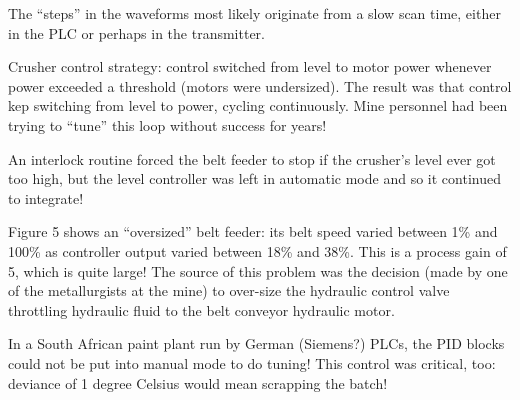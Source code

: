 












The ``steps'' in the waveforms most likely originate from a slow scan time, either in the PLC or perhaps in the transmitter.

\vskip 10pt

Crusher control strategy: control switched from level to motor power whenever power exceeded a threshold (motors were undersized).  The result was that control kep switching from level to power, cycling continuously.  Mine personnel had been trying to ``tune'' this loop without success for years!

\vskip 10pt

An interlock routine forced the belt feeder to stop if the crusher's level ever got too high, but the level controller was left in automatic mode and so it continued to integrate!

\vskip 10pt

Figure 5 shows an ``oversized'' belt feeder: its belt speed varied between 1\% and 100\% as controller output varied between 18\% and 38\%.  This is a process gain of 5, which is quite large!  The source of this problem was the decision (made by one of the metallurgists at the mine) to over-size the hydraulic control valve throttling hydraulic fluid to the belt conveyor hydraulic motor.

\vskip 10pt

In a South African paint plant run by German (Siemens?) PLCs, the PID blocks could not be put into manual mode to do tuning!  This control was critical, too: deviance of 1 degree Celsius would mean scrapping the batch!











